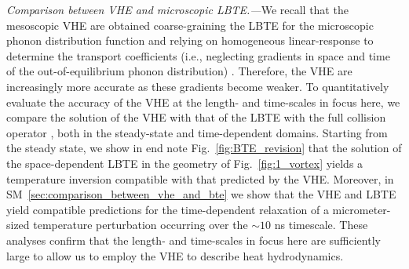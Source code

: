 \documentclass[
prb,
twocolumn,
superscriptaddress,
 amsmath,amssymb,
 aps,
longbibliography,
]{revtex4-2}
\begin{document}
\textit{Comparison between VHE and microscopic LBTE.---}We recall that the mesoscopic VHE are obtained
coarse-graining the LBTE for the microscopic phonon distribution function and relying on homogeneous linear-response to determine the transport coefficients (i.e., neglecting gradients in space and time of the out-of-equilibrium phonon distribution) \cite{Simoncelli2020}. Therefore, the VHE are increasingly more accurate as these gradients become weaker.
To quantitatively evaluate the accuracy of the VHE at the length- and time-scales in focus here, we compare the solution of the VHE with that of the LBTE with the full collision operator \cite{raya-moreno_bte-barna_2022}, both in the steady-state and time-dependent domains. Starting from the steady state, we show in end note Fig.~\ref{fig:BTE_revision} that the solution of the space-dependent LBTE in the geometry of Fig.~\ref{fig:1_vortex} yields a temperature inversion compatible with that predicted by the VHE.
Moreover, in SM~\ref{sec:comparison_between_vhe_and_bte} we show that the VHE and LBTE yield compatible predictions for the time-dependent relaxation of a micrometer-sized temperature perturbation occurring over the $\sim 10$ ns timescale. These analyses confirm that the length- and time-scales in focus here are sufficiently large to allow us to employ the VHE to describe heat hydrodynamics.
\end{document}
